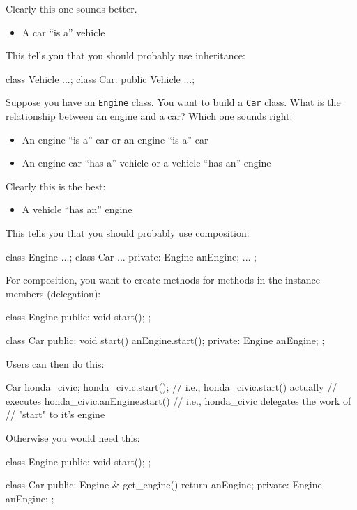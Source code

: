 Clearly this one sounds better.

\begin{itemize}
\item
  A car ``is a'' vehicle
\end{itemize}

This tells you that you should probably use inheritance:
\begin{console}
class Vehicle {...};
class Car: public Vehicle {...};
\end{console}

Suppose you have an \verb!Engine! class. You want to build a \verb!Car!
class. What is the relationship between an engine and a car? Which one
sounds right:

\begin{itemize}
\item
  An engine ``is a'' car or an engine ``is a'' car
\item
  An engine car ``has a'' vehicle or a vehicle ``has an'' engine
\end{itemize}

Clearly this is the best:
\begin{itemize}
\item
  A vehicle ``has an'' engine
\end{itemize}

This tells you that you should probably use composition:
\begin{console}
class Engine {...};
class Car {
...
private:
        Engine anEngine;
        ...
};
\end{console}

For composition, you want to create methods for methods in the instance
members (delegation):
\begin{console}
class Engine {
public:
        void start();
};

class Car {
public:
        void start() { anEngine.start(); }
private:
        Engine anEngine;
};
\end{console}

Users can then do this:
\begin{console}
Car honda_civic;
honda_civic.start();
// i.e., honda_civic.start() actually
// executes honda_civic.anEngine.start()
// i.e., honda_civic delegates the work of
// "start" to it's engine
\end{console}

Otherwise you would need this:
\begin{console}
class Engine {
public:
        void start();
};

class Car {
public:
        Engine & get_engine() { return anEngine; }
private:
        Engine anEngine;
};
\end{console}

